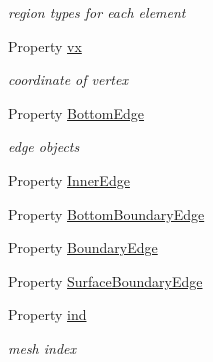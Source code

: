 \begin{DoxyCompactItemize}
\begin{DoxyCompactList}\small\item\em region types for each element \end{DoxyCompactList}\item 
Property \hyperlink{class_ndg_extend_mesh3d_afb4b1254bc0cc86fc2e58b5595d37b54}{vx}
\begin{DoxyCompactList}\small\item\em coordinate of vertex \end{DoxyCompactList}\item 
Property \hyperlink{class_ndg_extend_mesh3d_afde3cac5e29d5055cf1a9559abf0336c}{Bottom\+Edge}
\begin{DoxyCompactList}\small\item\em edge objects \end{DoxyCompactList}\item 
Property \hyperlink{class_ndg_extend_mesh3d_ad639925e01064ee306272b970c75a460}{Inner\+Edge}
\item 
Property \hyperlink{class_ndg_extend_mesh3d_aebeb43d01e2f24ecf3eadaa874b9c611}{Bottom\+Boundary\+Edge}
\item 
Property \hyperlink{class_ndg_extend_mesh3d_acd9261022269d73bd681fdacbd4e0540}{Boundary\+Edge}
\item 
Property \hyperlink{class_ndg_extend_mesh3d_a7d004f753e448f5464d30fde21ed3698}{Surface\+Boundary\+Edge}
\item 
Property \hyperlink{class_ndg_extend_mesh3d_a23eb9078aa41067a20143d23dbb8b1c2}{ind}
\begin{DoxyCompactList}\small\item\em mesh index \end{DoxyCompactList}\end{DoxyCompactItemize}
